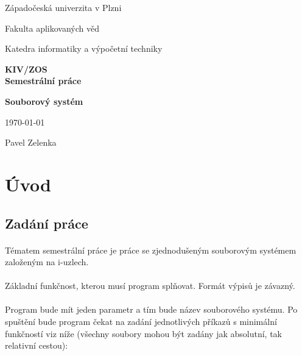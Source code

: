 \documentclass[12pt]{scrartcl}
\begin{document}
\begin{titlepage}
	\centering
	{\fontsize{22}{40}\selectfont
	Západočeská univerzita v Plzni\par
	Fakulta aplikovaných věd\par
	Katedra informatiky a výpočetní techniky\par
	}		
	\vspace{2.75cm}
	{\huge\bfseries KIV/ZOS \\ Semestrální práce \par}
	\vspace{2cm}
	{\Huge\bfseries Souborový systém \par}
	\vfill
	\raggedleft
	{\fontsize{16}{0}\selectfont \today \hfill}
	\raggedright
	{\fontsize{16}{0}\selectfont Pavel Zelenka}
\end{titlepage}
\newpage
{}
\newpage
\section{Úvod}
\subsection{Zadání práce}
\paragraph{}
Tématem semestrální práce je práce se zjednodušeným souborovým systémem založeným na
i-uzlech.
\paragraph{}
Základní funkčnost, kterou musí program splňovat. Formát výpisů je závazný.
\paragraph{}
Program bude mít jeden parametr a tím bude název souborového systému. Po spuštění bude program čekat na zadání jednotlivých příkazů s minimální funkčností viz níže (všechny soubory mohou být zadány jak absolutní, tak relativní cestou):
\end{document}
